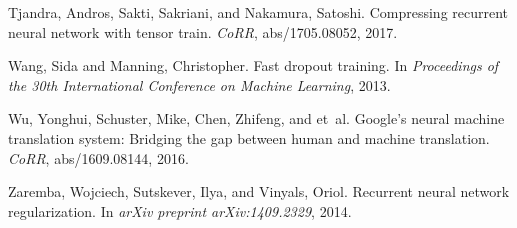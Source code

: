 \documentclass{article}
\begin{document}
\begin{thebibliography}{30}
Tjandra, Andros, Sakti, Sakriani, and Nakamura, Satoshi.
\newblock Compressing recurrent neural network with tensor train.
\newblock \emph{CoRR}, abs/1705.08052, 2017.

Wang, Sida and Manning, Christopher.
\newblock Fast dropout training.
\newblock In \emph{Proceedings of the 30th International Conference on Machine
  Learning}, 2013.

Wu, Yonghui, Schuster, Mike, Chen, Zhifeng, and et~al.
\newblock Google's neural machine translation system: Bridging the gap between
  human and machine translation.
\newblock \emph{CoRR}, abs/1609.08144, 2016.

Zaremba, Wojciech, Sutskever, Ilya, and Vinyals, Oriol.
\newblock Recurrent neural network regularization.
\newblock In \emph{arXiv preprint arXiv:1409.2329}, 2014.

\end{thebibliography}

\end{document}
